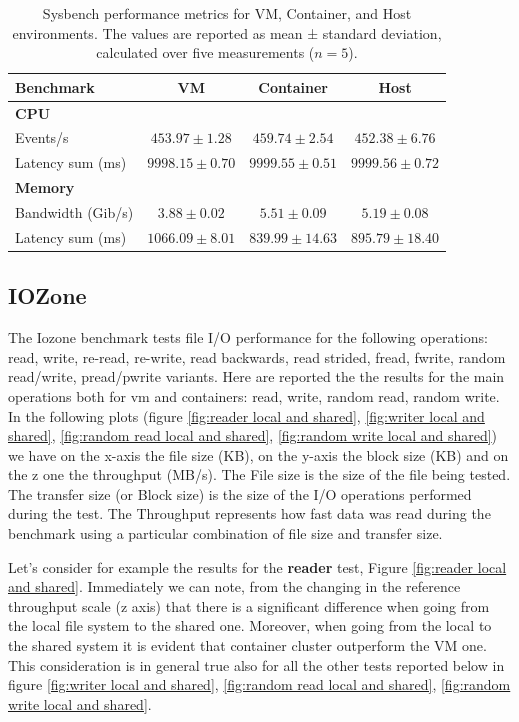 \begin{table}[htbp]
    \centering
    \begin{tabular}{lccc}
    \toprule
    \textbf{Benchmark} & \textbf{VM} & \textbf{Container} & \textbf{Host} \\
    \midrule
    \textbf{CPU} & & & \\
    Events/s & $453.97 \pm 1.28$ & $459.74 \pm 2.54$ & $452.38 \pm 6.76$ \\
    Latency sum (ms) & $9998.15 \pm 0.70$ & $9999.55 \pm 0.51$ & $9999.56 \pm 0.72$ \\
    \midrule
    \textbf{Memory} & & & \\
    Bandwidth (Gib/s) & $3.88 \pm 0.02$ & $5.51 \pm 0.09$ & $5.19 \pm 0.08$ \\
    Latency sum (ms) & $1066.09 \pm 8.01$ & $839.99 \pm 14.63$ & $895.79 \pm 18.40$ \\
    \bottomrule

    \end{tabular}
    \caption{Sysbench performance metrics for VM, Container, and Host environments. The values are reported as mean ± standard deviation, calculated over five measurements ($n = 5$).}
    \label{tab:sysbench}
\end{table}


\subsection{IOZone}

The Iozone benchmark tests file I/O performance for the following operations: read, write, re-read, re-write, read backwards, read strided, fread, fwrite, random read/write, pread/pwrite variants. Here are reported the the results for the main operations both for vm and containers: read, write, random read, random write. In the following plots (figure \ref{fig:reader local and shared}, \ref{fig:writer local and shared}, \ref{fig:random read local and shared}, \ref{fig:random write local and shared}) we have on the x-axis the file size (KB), on the y-axis the block size (KB) and on the z one the throughput (MB/s).
The File size is the size of the file being tested. The transfer size (or Block size) is the size of the I/O operations performed during the test.
The Throughput represents how fast data was read during the benchmark using a particular combination of file size and transfer size.

Let's consider for example the results for the \textbf{reader} test, Figure \ref{fig:reader local and shared}. Immediately we can note, from the changing in the reference throughput scale (z axis) that there is a significant difference when going from the local file system to the shared one. Moreover, when going from the local to the shared system it is evident that container cluster outperform the VM one. This consideration is in general true also for all the other tests reported below in figure \ref{fig:writer local and shared}, \ref{fig:random read local and shared}, \ref{fig:random write local and shared}.

